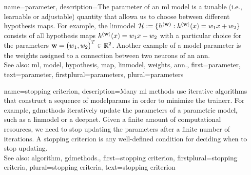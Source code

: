 {name={parameter},
	description={The parameter of an \gls{ml} \gls{model} is a tunable 
		(i.e., learnable or adjustable) quantity that allowa us to choose 
		between different \gls{hypothesis} \glspl{map}. For example, the \gls{linmodel} $\mathcal{H} := \{h^{({\bf w})}: h^{({\bf w})}(x)= w_{1} x + w_{2}\}$ 
		consists of all \gls{hypothesis} \glspl{map} $h^{({\bf w})}(x)= w_{1} x + w_{2}$ 
		with a particular choice for the parameters ${\bf w} = \big(w_{1},w_{2}\big)^{T} \in \mathbb{R}^{2}$. 
		Another example of a \gls{model} parameter is the \gls{weights} assigned to a connection between two neurons of an \gls{ann}.
				\\
		See also: \gls{ml}, \gls{model}, \gls{hypothesis}, \gls{map}, \gls{linmodel}, \gls{weights}, \gls{ann}.},
		first={parameter},
		text={parameter},
		firstplural={parameters}, 
 		plural={parameters}
}

    
{name={stopping criterion},
	description={Many \gls{ml} methods use iterative \glspl{algorithm} 
		that construct a sequence of \gls{modelparams} in order to minimize the \gls{trainerr}. 
		For example, \gls{gdmethods} iteratively update the \glspl{parameter} of a parametric \gls{model}, 
		such as a \gls{linmodel} or a \gls{deepnet}. Given a finite amount of computational 
		resources, we need to stop updating the \glspl{parameter} after a finite number of iterations. 
		A stopping criterion is any well-defined condition for deciding when to stop  
		updating.
				\\
		See also: \gls{algorithm}, \gls{gdmethods}.},
		first={stopping criterion},
		firstplural={stopping criteria},
		plural={stopping criteria}, 
		text={stopping criterion}
}

